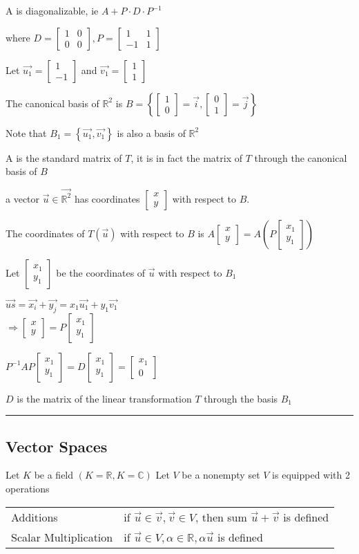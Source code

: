 \documentclass[12pt]{article}
\renewcommand{\v}[1]{\overrightarrow{#1}}
\newcommand\m[1]{\begin{bmatrix}#1\end{bmatrix}}
\newcommand{\real}[0]{\mathbb{R}}
\newcommand{\complex}[0]{\mathbb{C}}
\newcommand{\bb}[1]{\left\{#1\right\}}
\newcommand{\pp}[1]{\left(#1\right)}
\newcommand{\divider}[0]{\textcolor{lightgray}{\rule{\textwidth}{0.1pt}}}
\begin{document}
A is diagonalizable, ie \(A + P \cdot D \cdot P^{-1}\)

where \(D = \m{1 & 0 \\ 0 & 0}, P = \m{1 & 1 \\ -1 & 1}\)

Let \(\v{u_1} = \m{1 \\ -1}\) and \(\v{v_1} = \m{1 \\ 1}\)

The canonical basis of \(\real^2\) is \(B = \bb{\m{1 \\ 0} = \v{i}, \m{0 \\ 1} = \v{j}}\)

Note that \(B_1 = \bb{\v{u_1}, \v{v_1}}\) is also a basis of \(\real^2\)

A is the standard matrix of \(T\), it is in fact the matrix of \(T\) through the canonical basis of \(B\)

a vector \(\v{u} \in \v{\real^2}\) has coordinates \(\m{x \\ y}\) with respect to \(B\).

The coordinates of \(T(\v{u})\) with respect to \(B\) is \(A \m{x \\ y} = A\pp{P \m{x_1 \\ y_1}}\) 

Let \(\m{x_1 \\ y_1}\) be the coordinates of \(\v{u}\) with respect to \(B_1\)

\(\v{us} = \v{x_i} + \v{y_j} = x_1 \v{u_1} + y_1 \v{v_1}\) \\
\(\Rightarrow \m{x \\ y} = P \m{x_1 \\ y_1}\)

\(P^{-1}AP \m{x_1 \\ y_1} = D \m{x_1 \\ y_1} = \m{x_1 \\ 0}\)

\(D\) is the matrix of the linear transformation \(T\) through the basis \(B_1\)

\divider

\subsection{Vector Spaces}

Let \(K\) be a field \(\pp{K = \real, K = \complex}\)
Let \(V\) be a nonempty set
\(V\) is equipped with 2 operations

\begin{tabular}{@{} l l}
	Additions	& if \(\v{u} \in \v{v}, \v{v} \in V\), then sum \(\v{u} + \v{v}\) is defined \\
	Scalar Multiplication & if \(\v{u} \in V, \alpha \in \real, \alpha \v{u}\) is defined
\end{tabular}
\end{document}

